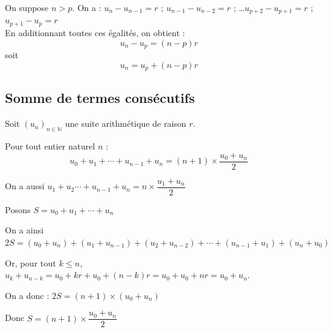 \documentclass[french]{book}
\newcommand{\N}{\mathbb {N}}
\newcommand{\ie}{\leq}
\newcommand{\suite}[1][u]{\left( #1_{n} \right)_{n\in\N}}
\begin{document}
\begin{demo}
On suppose $n>p$. On a : 
$u_{n}-u_{n-1}=r$ ; \hfill $u_{n-1}-u_{n-2}=r$ ; \hfill \dots \hfill $u_{p+2}-u_{p+1}=r$ ; \hfill $u_{p+1}-u_{p}=r$ \\
En additionnant toutes ces égalités, on obtient :
\[u_{n}-u_{p}=(n-p)r\]
soit \[u_n=u_p+(n-p)r\]
\end{demo}

\subsection{Somme de termes consécutifs}
\begin{prop}
Soit $\suite[u]$ une suite arithmétique de raison $r$.
\par Pour tout entier naturel $n$ :
\[u_{0}+u_{1}+ \cdots + u_{n-1}+u_{n}=(n+1)\times \dfrac{u_{0}+u_{n}}{2}\]
\end{prop}

\begin{rem}
On a aussi $u_{1}+u_2 \cdots + u_{n-1}+u_{n}=n\times \dfrac{u_{1}+u_{n}}{2}$
\end{rem}

\begin{demo}
\par Posons $S=u_0+u_1+ \cdots +u_n$
\par On a ainsi $2S=(u_0+u_n)+(u_1+u_{n-1})+(u_2+u_{n-2})+ \cdots +(u_{n-1}+u_1)+(u_n+u_0)$
\par Or, pour tout $k\ie n$, $u_k+u_{n-k}=u_0+kr+u_0+(n-k)r=u_0+u_0+nr=u_0+u_n$.
\par On a donc : $2S=(n+1)\times (u_0+u_n)$
\par Donc $S=(n+1)\times \dfrac{u_{0}+u_{n}}{2}$
\end{demo}

\newpage
\end{document}
